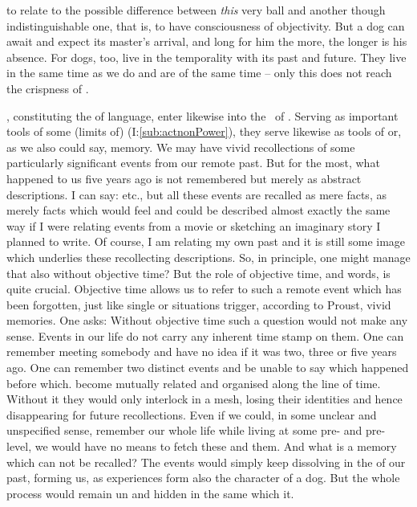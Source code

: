 to relate to the possible difference between {\em this} very ball and another
though indistinguishable one, that is, to have consciousness of objectivity. But
a dog can await and expect its master's arrival, and long for him the more, the
longer is his absence. For dogs, too, live in the temporality with its past and
future. They live in the same time as we do and are  of the same time
-- only this  does not reach the crispness of .

, constituting the  of language,
enter likewise into the \nexus\ of . Serving as important tools
of  some (limits of)  (I:\ref{sub:actnonPower}),
they serve likewise as tools of  or, as we also could say,
 memory. We may have vivid  recollections of some
particularly significant events from our remote past. But for the most, what
happened to us five years ago is not remembered  but merely as
abstract descriptions. I can say:  etc., but all these events are recalled as mere
facts, as merely  facts which would feel and could be described
almost exactly the same way if I were relating events from a movie or sketching
an imaginary story I planned to write. Of course, I am relating my own past and
it is still some  image which underlies these recollecting
descriptions. So, in principle, one might manage that also without objective
time? But the role of objective time, and words, is quite crucial. Objective
time allows us to refer to such a remote event which has been 
forgotten, just like single  or situations trigger, according to
Proust, vivid  memories. One asks:   Without objective time such a question would not
make any sense. Events in our life
do not carry any inherent time stamp on them. One can remember meeting somebody
and have no idea if it was two, three or five years ago. One can remember two
distinct events and be unable to say which happened before which.
 become mutually related and organised along the line of
 time. Without it they would only interlock in a 
mesh, losing their identities and hence disappearing for future recollections.
Even if we could, in some unclear and unspecified sense, remember our whole life
while living at some pre- and pre- level, we would
have no means to fetch these  and  them. And what is
a memory which can not be recalled? The events would simply keep dissolving in
the  of our past, forming us, as experiences form also the
character of a dog. But the whole process would remain un and
hidden in the same  which  it.

